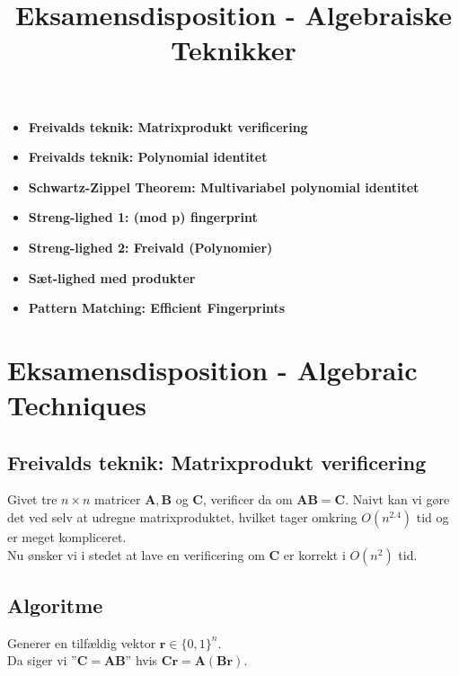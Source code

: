 
\title{Eksamensdisposition - Algebraiske Teknikker}


\maketitle

\begin{itemize}
  \item \textbf{Freivalds teknik: Matrixprodukt verificering}
  \item \textbf{Freivalds teknik: Polynomial identitet}
  \item \textbf{Schwartz-Zippel Theorem: Multivariabel polynomial identitet}
  \item \textbf{Streng-lighed 1: (mod p) fingerprint}
  \item \textbf{Streng-lighed 2: Freivald (Polynomier)}
  \item \textbf{Sæt-lighed med produkter}
  \item \textbf{Pattern Matching: Efficient Fingerprints}
\end{itemize}


\newpage
\section{Eksamensdisposition - Algebraic Techniques}
\subsection{Freivalds teknik: Matrixprodukt verificering}

Givet tre $n \times n$ matricer $\mathbf A, \mathbf B$ og $\mathbf C$, verificer da om $\mathbf{AB} = \mathbf C$. Naivt kan vi gøre det ved selv at udregne matrixproduktet, hvilket tager omkring $O(n^{2.4})$ tid og er meget kompliceret.\\

Nu ønsker vi i stedet at lave en verificering om $\mathbf C$ er korrekt i $O(n^2)$ tid.

\subsection{Algoritme}
Generer en tilfældig vektor $\mathbf r \in \{0, 1\}^n$.\\
Da siger vi ''$\mathbf C = \mathbf{AB}$'' hvis $\mathbf{Cr} = \mathbf A (\mathbf{Br})$.


